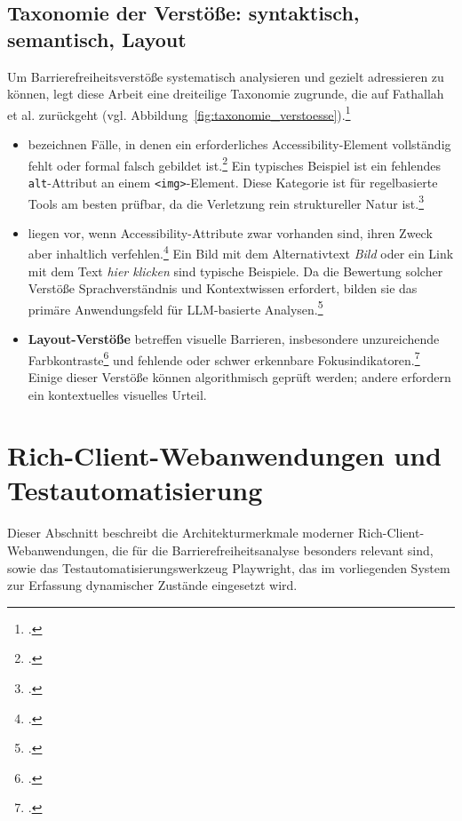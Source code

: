 \subsection{Taxonomie der Verstöße: syntaktisch, semantisch, Layout} \label{Taxonomie}
Um Barrierefreiheitsverstöße systematisch analysieren und gezielt adressieren zu können, legt diese Arbeit eine dreiteilige Taxonomie zugrunde, die auf Fathallah et al. zurückgeht (vgl. Abbildung~\ref{fig:taxonomie_verstoesse}).\footcite[Vgl.][]{fathallah_accessguru_2025}

\begin{itemize}
    \item {} bezeichnen Fälle, in denen ein erforderliches Accessibility-Element vollständig fehlt oder formal falsch gebildet ist.\footcite[Vgl.][S. 102]{tafreshipour_ma11y_2024} Ein typisches Beispiel ist ein fehlendes \texttt{alt}-Attribut an einem \texttt{<img>}-Element. Diese Kategorie ist für regelbasierte Tools am besten prüfbar, da die Verletzung rein struktureller Natur ist.\footcite[Vgl.][S. 569 ff.]{Flanagan_2020}
    \item {} liegen vor, wenn Accessibility-Attribute zwar vorhanden sind, ihren Zweck aber inhaltlich verfehlen.\footcite[Vgl.][]{WCAG} Ein Bild mit dem Alternativtext \textit{Bild} oder ein Link mit dem Text \textit{hier klicken} sind typische Beispiele. Da die Bewertung solcher Verstöße Sprachverständnis und Kontextwissen erfordert, bilden sie das primäre Anwendungsfeld für \ac{LLM}-basierte Analysen.\footcite[Vgl.][FSE101:2]{he_enhancing_2025}
    \item \textbf{Layout-Verstöße} betreffen visuelle Barrieren, insbesondere unzureichende Farbkontraste\footcite[Vgl.][Erfolgskriterium 1.4.3]{WCAG} und fehlende oder schwer erkennbare Fokusindikatoren.\footcite[Vgl.][Erfolgskriterium 2.4.7--2.4.13]{WCAG} Einige dieser Verstöße können algorithmisch geprüft werden; andere erfordern ein kontextuelles visuelles Urteil.
\end{itemize}



\FloatBarrier
\section{Rich-Client-Webanwendungen und Testautomatisierung}\label{kap:2.3}

Dieser Abschnitt beschreibt die Architekturmerkmale moderner Rich-Client-Webanwendungen, die für die Barrierefreiheitsanalyse besonders relevant sind, sowie das Testautomatisierungswerkzeug Playwright, das im vorliegenden System zur Erfassung dynamischer Zustände eingesetzt wird.

